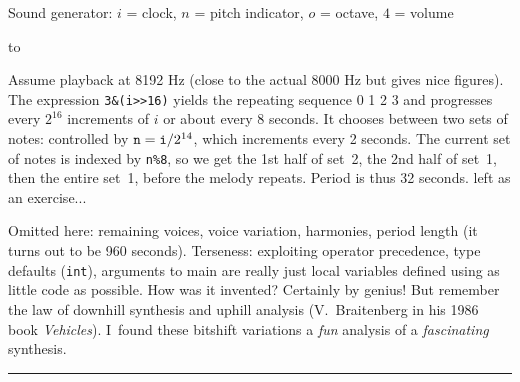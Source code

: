 \medskip
{}

\medskip
{}
\medskip
{}
\medskip
{}
\medskip
\centerline{} %
\centerline{Sound generator:
 $i$ = clock, $n$ = pitch indicator, $o$ = octave, $4$ = volume}

\medskip
{}
\halign to

\smallskip
{}
\smallskip\noindent
Assume playback at 8192 Hz (close to the actual 8000 Hz
but gives nice figures).
The expression {\tt 3\&(i>>16)} yields the repeating sequence
0 1 2 3 and progresses every $2^{16}$ increments of $i$ or
about every 8 seconds. It chooses between two sets of notes:
\smallskip
{}
\smallskip
{} controlled by ${\tt n}={\tt i}/2^{14}$,
which increments every 2 seconds. The current set of notes
is indexed by {\tt n\%8}, so we get the 1st half of set~2,
the 2nd half of set~1, then the entire set~1, before the
melody repeats. Period is thus 32 seconds.
\vskip7mm
\vskip-2mm
 left as an exercise...

\smallskip
{}
\smallskip\noindent
Omitted here: remaining voices, voice variation, harmonies,
period length (it turns out to be 960 seconds).
Terseness: exploiting operator precedence, type defaults ({\tt int}),
arguments to main are really just local variables defined using
as little code as possible.
How was it invented? Certainly by genius!
But remember the law of downhill synthesis and uphill analysis
(V.~Braitenberg in his 1986 book {\sl Vehicles\/}).
I~found these bitshift variations
a {\it fun\/} analysis of a {\it fascinating\/} synthesis.
\smallskip\hrule

\bye
